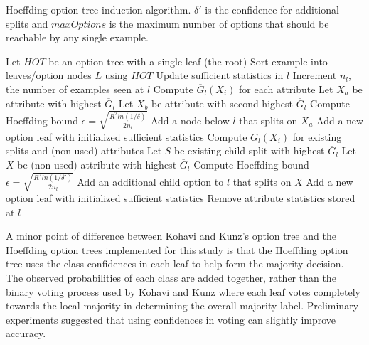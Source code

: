 \begin{algorithm}
\caption{Hoeffding option tree induction algorithm. $\delta'$ is the confidence for additional splits and $maxOptions$ is the maximum number of options that should be reachable by any single example.}
\begin{algorithmic}[1]
\STATE Let $HOT$ be an option tree with a single leaf (the root)
\STATE Sort example into leaves/option nodes $L$ using $HOT$
\STATE Update sufficient statistics in $l$
\STATE Increment $n_l$, the number of examples seen at $l$
\STATE Compute $\overline{G}_{l}(X_{i})$ for each attribute
\STATE Let $X_{a}$ be attribute with highest $\overline{G}_{l}$
\STATE Let $X_{b}$ be attribute with second-highest $\overline{G}_{l}$
\STATE Compute Hoeffding bound $\epsilon = \sqrt{\frac{R^{2}ln(1/\delta)}{2n_{l}}}$
\STATE Add a node below $l$ that splits on $X_{a}$
\STATE Add a new option leaf with initialized sufficient statistics
\ENDFOR
\ENDIF
\ELSE
{}
\STATE Compute $\overline{G}_{l}(X_{i})$ for existing splits and (non-used) attributes
\STATE Let $S$ be existing child split with highest $\overline{G}_{l}$
\STATE Let $X$ be (non-used) attribute with highest $\overline{G}_{l}$
\STATE Compute Hoeffding bound $\epsilon = \sqrt{\frac{R^{2}ln(1/\delta')}{2n_{l}}}$
\STATE Add an additional child option to $l$ that splits on $X$
\STATE Add a new option leaf with initialized sufficient statistics
\ENDFOR
\ENDIF
\ELSE
\STATE Remove attribute statistics stored at $l$
\ENDIF
\ENDIF
\ENDIF
\ENDFOR
\ENDFOR
\end{algorithmic}
\label{alg:hot}
\end{algorithm}

A minor point of difference between Kohavi and Kunz's option tree and the Hoeffding option trees implemented for this study is that the Hoeffding option tree uses the class confidences in each leaf to help form the majority decision. The observed probabilities of each class are added together, rather than the binary voting process used by Kohavi and Kunz where each leaf votes completely towards the local majority in determining the overall majority label. Preliminary experiments suggested that using confidences in voting can slightly improve accuracy.


